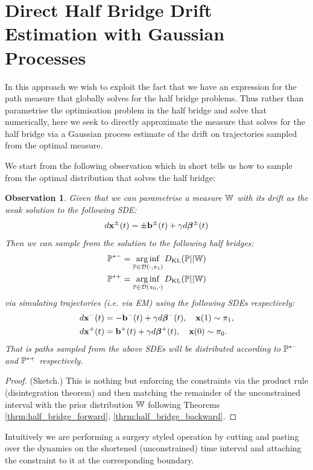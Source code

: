 \documentclass[a4paper,12pt,twoside,openright]{report}
\newtheorem{observation}[theorem]{Observation}
\theoremstyle{definition}
\begin{document}
\section{Direct Half Bridge Drift Estimation with Gaussian Processes}

In this approach we wish to exploit the fact that we have an expression for the path measure that globally solves for the half bridge problems.  Thus rather than parametrise the optimisation problem in the half bridge and solve that numerically, here we seek to directly approximate the measure that solves for the half bridge via a Gaussian process estimate of the drift on trajectories sampled from the optimal measure.

We start from the following observation which in short tells us how to sample from the optimal distribution that solves the half bridge:
\begin{observation}
Given that we can parametrise a measure $\W$ with its drift as the weak solution to the following SDE:
\begin{align*}
    d\rvx^{\pm}(t) =  \pm \rvb^{\pm}(t) + \gamma d \rvw^{\pm}(t) 
\end{align*}
Then we can sample from the solution to the following half bridges:
\begin{align*}
   \P^{*-} = \arginf_{\P \in \calD(\cdot,\pi_1)}\KL(\P || \W) \\ 
   \P^{*+} = \arginf_{\P \in \calD(\pi_0,\cdot )}\KL(\P || \W)
\end{align*}
via simulating trajectories (i.e. via EM) using the following SDEs respectively:
\begin{align*}
     d\rvx^{-}(t) &=  - \rvb^{-}(t) + \gamma d \rvw^{-}(t) , \quad  \rvx(1) \sim \pi_1, \\
     d\rvx^{+}(t) &=  \rvb^{+}(t) + \gamma d \rvw^{+}(t) , \quad  \rvx(0) \sim \pi_0.
\end{align*}
That is paths sampled from the above SDEs will be distributed according to $\P^{*-}$ and $\P^{*+}$ respectively.
\end{observation}
\begin{proof}(Sketch.) This is nothing but enforcing the constraints via the product rule (disintegration theorem) and then matching the remainder of the unconstrained interval with the prior distribution $\W$ following Theorems \ref{thrm:half_bridge_forward}, \ref{thrm:half_bridge_backward}.
\end{proof}
Intuitively we are performing a surgery styled operation by cutting and pasting over the dynamics on the shortened (unconstrained) time interval and attaching the constraint to it at the corresponding boundary.
\end{document}

